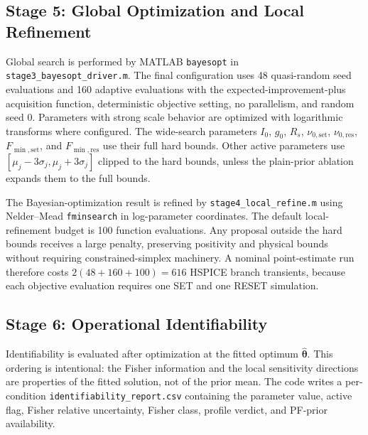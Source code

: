 \documentclass[journal]{IEEEtran}
\begin{document}
\subsection{Stage 5: Global Optimization and Local Refinement}
\label{sec:optimization}

Global search is performed by MATLAB \texttt{bayesopt} in
\texttt{stage3\_bayesopt\_driver.m}.  The final configuration uses 48
quasi-random seed evaluations and 160 adaptive evaluations with the
expected-improvement-plus acquisition function, deterministic objective
setting, no parallelism, and random seed 0.  Parameters with strong scale
behavior are optimized with logarithmic transforms where configured.  The
wide-search parameters $I_0$, $g_0$, $R_s$, $\nu_{0,\mathrm{set}}$,
$\nu_{0,\mathrm{res}}$, $F_{\min,\mathrm{set}}$, and
$F_{\min,\mathrm{res}}$ use their full hard bounds.  Other active parameters
use $[\mu_j-3\sigma_j,\mu_j+3\sigma_j]$ clipped to the hard bounds, unless the
plain-prior ablation expands them to the full bounds.

The Bayesian-optimization result is refined by \texttt{stage4\_local\_refine.m}
using Nelder--Mead \texttt{fminsearch} in log-parameter coordinates.  The
default local-refinement budget is 100 function evaluations.  Any proposal
outside the hard bounds receives a large penalty, preserving positivity and
physical bounds without requiring constrained-simplex machinery.  A nominal
point-estimate run therefore costs
$2(48+160+100)=616$ HSPICE branch transients, because each objective
evaluation requires one SET and one RESET simulation.

\subsection{Stage 6: Operational Identifiability}
\label{sec:identifiability}

Identifiability is evaluated after optimization at the fitted optimum
$\hat{\boldsymbol{\theta}}$.  This ordering is intentional: the Fisher
information and the local sensitivity directions are properties of the fitted
solution, not of the prior mean.  The code writes a per-condition
\texttt{identifiability\_report.csv} containing the parameter value, active
flag, Fisher relative uncertainty, Fisher class, profile verdict, and PF-prior
availability.
\end{document}
